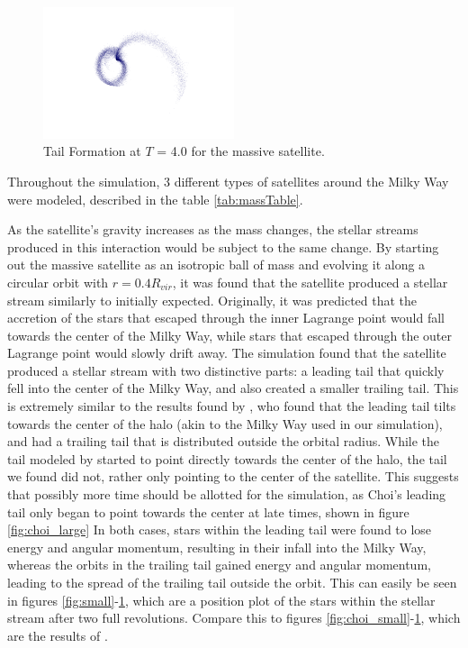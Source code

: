 \documentclass[twocolumn]{article}
\begin{document}
\begin{figure}
	\centering
	\includegraphics[width=0.5\textwidth]{large.png}	
	\caption{Tail Formation at $T$ = 4.0 for the massive satellite. }
	\label{fig:large}
\end{figure}



Throughout the simulation, 3 different types of satellites around the Milky Way were modeled, described in the table \ref{tab:massTable}.

As the satellite's gravity increases as the mass changes, the stellar streams produced in this interaction would be subject to the same change. By starting out the massive satellite as an isotropic ball of mass and evolving it along a circular orbit with $r = 0.4R_{vir}$, it was found that the satellite produced a stellar stream similarly to initially expected. Originally, it was predicted that the accretion of the stars that escaped through the inner Lagrange point would fall towards the center of the Milky Way, while stars that escaped through the outer Lagrange point would slowly drift away. The simulation found that the satellite produced a stellar stream with two distinctive parts: a leading tail that quickly fell into the center of the Milky Way, and also created a smaller trailing tail. This is extremely similar to the results found by \cite{dynamicsOfTidalTails}, who found that the leading tail tilts towards the center of the halo (akin to the Milky Way used in our simulation), and had a trailing tail that is distributed outside the orbital radius. While the tail modeled by \cite{dynamicsOfTidalTails} started to point directly towards the center of the halo, the tail we found did not, rather only pointing to the center of the satellite. This suggests that possibly more time should be allotted for the simulation, as Choi's leading tail only began to point towards the center at late times, shown in figure \ref{fig:choi_large} In both cases, stars within the leading tail were found to lose energy and angular momentum, resulting in their infall into the Milky Way, whereas the orbits in the trailing tail gained energy and angular momentum, leading to the spread of the trailing tail outside the orbit. This can easily be seen in figures \ref{fig:small}-\ref{fig:large}, which are a position plot of the stars within the stellar stream after two full revolutions. Compare this to figures \ref{fig:choi_small}-\ref{fig:large}, which are the results of \cite{dynamicsOfTidalTails}.
\end{document}
